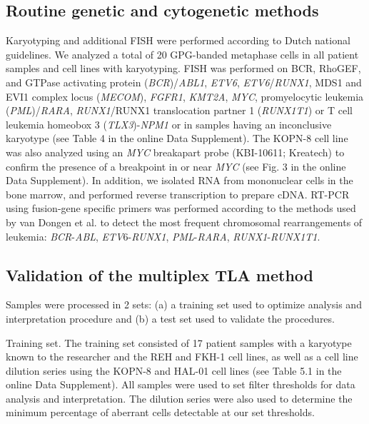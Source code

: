 \subsection{Routine genetic and cytogenetic methods}
Karyotyping and additional FISH were performed according to Dutch national guidelines\cite{Snijder_2015}. 
We analyzed a total of 20 GPG-banded metaphase cells in all patient samples and cell lines with karyotyping. 
FISH was performed on BCR, RhoGEF, and GTPase activating protein (\textsl{BCR})/\textsl{ABL1}, \textsl{ETV6}, \textsl{ETV6}/\textsl{RUNX1}, MDS1 and EVI1 complex locus (\textsl{MECOM}), \textsl{FGFR1}, \textsl{KMT2A}, \textsl{MYC}, promyelocytic leukemia (\textsl{PML})/\textsl{RARA}, \textsl{RUNX1}/RUNX1 translocation partner 1 (\textsl{RUNX1T1}) or T cell leukemia homeobox 3 (\textsl{TLX3})-\textsl{NPM1} or in samples having an inconclusive karyotype (see Table 4 in the online Data Supplement). 
The KOPN-8 cell line was also analyzed using an \textsl{MYC} breakapart probe (KBI-10611; Kreatech) to confirm the presence of a breakpoint in or near \textsl{MYC} (see Fig. 3 in the online Data Supplement). 
In addition, we isolated RNA from mononuclear cells in the bone marrow, and performed reverse transcription to prepare cDNA. RT-PCR using fusion-gene specific primers was performed according to the methods used by van Dongen et al.\cite{van_Dongen_1999} to detect the most frequent chromosomal rearrangements of leukemia: \textsl{BCR}-\textsl{ABL}, \textsl{ETV}6-\textsl{RUNX1}, \textsl{PML}-\textsl{RARA}, \textsl{RUNX1}-\textsl{RUNX1T1}.

\subsection{Validation of the multiplex TLA method}
Samples were processed in 2 sets: (a) a training set used to optimize analysis and interpretation procedure and (b) a test set used to validate the procedures. 

Training set. The training set consisted of 17 patient samples with a karyotype known to the researcher and the REH and FKH-1 cell lines, as well as a cell line dilution series using the KOPN-8 and HAL-01 cell lines (see Table 5.1 in the online Data Supplement). 
All samples were used to set filter thresholds for data analysis and interpretation. 
The dilution series were also used to determine the minimum percentage of aberrant cells detectable at our set thresholds.

